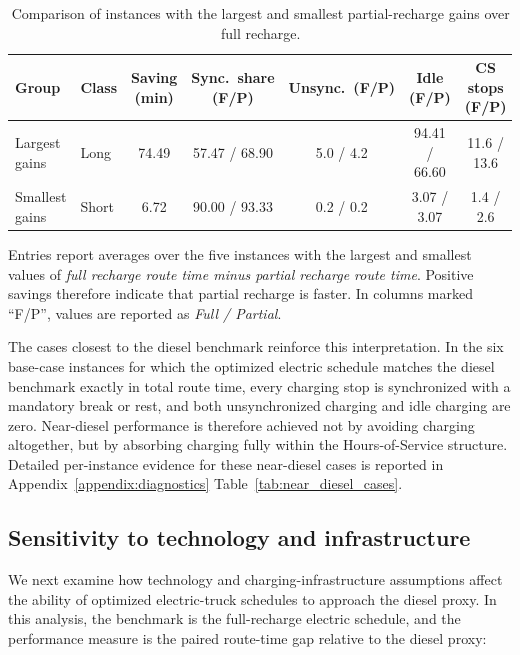 \documentclass[3p,11pt,authoryear]{elsarticle}  %
\begin{document}
\begin{table}[!htbp]
\centering
\caption{Comparison of instances with the largest and smallest partial-recharge gains over full recharge.}
\label{tab:partial_full_extremes}
\begin{threeparttable}
\small
\setlength{\tabcolsep}{3.5pt}
\renewcommand{\arraystretch}{1.1}
\begin{tabular}{
p{3.0cm}
l
S[table-format=2.2]
S[table-format=2.2]
S[table-format=1.1]
S[table-format=2.2]
S[table-format=2.1]
}
\toprule
Group & Class & {Saving (min)} & {Sync.\ share (F/P)} & {Unsync.\ (F/P)} & {Idle (F/P)} & {CS stops (F/P)} \\
\midrule
Largest gains  & Long  & 74.49 & 57.47 / 68.90 & 5.0 / 4.2 & 94.41 / 66.60 & 11.6 / 13.6 \\
Smallest gains & Short & 6.72  & 90.00 / 93.33 & 0.2 / 0.2 & 3.07 / 3.07   & 1.4 / 2.6 \\
\bottomrule
\end{tabular}
\begin{tablenotes}[flushleft]
\footnotesize
\item Entries report averages over the five instances with the largest and smallest values of \emph{full recharge route time minus partial recharge route time}. Positive savings therefore indicate that partial recharge is faster. In columns marked ``F/P'', values are reported as \emph{Full / Partial}.
\end{tablenotes}
\end{threeparttable}
\end{table}

The cases closest to the diesel benchmark reinforce this interpretation. In the six base-case instances for which the optimized electric schedule matches the diesel benchmark exactly in total route time, every charging stop is synchronized with a mandatory break or rest, and both unsynchronized charging and idle charging are zero. Near-diesel performance is therefore achieved not by avoiding charging altogether, but by absorbing charging fully within the Hours-of-Service structure. Detailed per-instance evidence for these near-diesel cases is reported in Appendix~\ref{appendix:diagnostics} Table~\ref{tab:near_diesel_cases}.

\subsection{Sensitivity to technology and infrastructure}

We next examine how technology and charging-infrastructure assumptions affect the ability of optimized electric-truck schedules to approach the diesel proxy. In this analysis, the benchmark is the full-recharge electric schedule, and the performance measure is the paired route-time gap relative to the diesel proxy:
\end{document}
